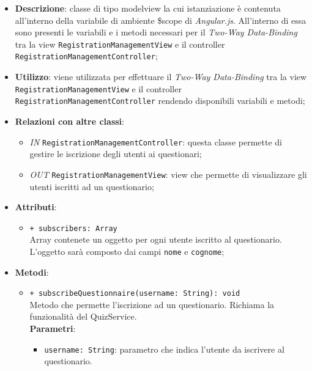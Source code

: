 	\begin{itemize}
		\item \textbf{Descrizione}: classe di tipo modelview la cui istanziazione è contenuta all'interno della variabile di ambiente \$scope di \textit{Angular.js}. All'interno di essa sono presenti le variabili e i metodi necessari per il \textit{Two-Way Data-Binding} tra la view \texttt{RegistrationManagementView} e il controller \texttt{RegistrationManagementController};
		\item \textbf{Utilizzo}: viene utilizzata per effettuare il \textit{Two-Way Data-Binding} tra la view \texttt{RegistrationManagementView} e il controller \texttt{RegistrationManagementController} rendendo disponibili variabili e metodi;
		\item \textbf{Relazioni con altre classi}: 
		\begin{itemize}
			\item \textit{IN} \texttt{RegistrationManagementController}: questa classe permette di gestire le iscrizione degli utenti ai questionari;
			\item \textit{OUT} \texttt{RegistrationManagementView}: view che permette di visualizzare gli utenti iscritti ad un questionario; 
		\end{itemize}
		\item \textbf{Attributi}: 
		\begin{itemize}
			\item \texttt{+ subscribers: Array} \\ Array contenete un oggetto per ogni utente iscritto al questionario. L'oggetto sarà composto dai campi \texttt{nome} e \texttt{cognome};
		\end{itemize}
		\item \textbf{Metodi}: 
		\begin{itemize}
			\item \texttt{+ subscribeQuestionnaire(username: String): void} \\ Metodo che permette l'iscrizione ad un questionario. Richiama la funzionalità del QuizService. \\
			\textbf{Parametri}:
			\begin{itemize}
				\item \texttt{username: String}: parametro che indica l'utente da iscrivere al questionario.
			\end{itemize}
		\end{itemize}
	\end{itemize}
	
	